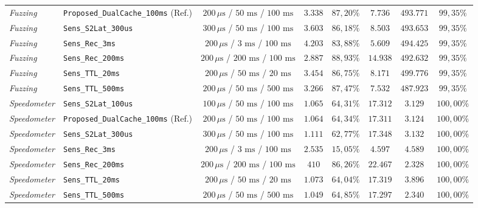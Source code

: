 \documentclass[conference]{IEEEtran}
\begin{document}
\begin{table}[t]
\begin{tabular}{@{}llcccccc@{}}
\textit{Fuzzing} & \texttt{Proposed\_DualCache\_100ms} (Ref.) & $200\,\mu\text{s}$ / $50\text{ ms}$ / $100\text{ ms}$ & $3.338$ & $87{,}20\%$ & $7.736$ & $493.771$ & $99{,}35\%$ \\
\textit{Fuzzing} & \texttt{Sens\_S2Lat\_300us} & $300\,\mu\text{s}$ / $50\text{ ms}$ / $100\text{ ms}$ & $3.603$ & $86{,}18\%$ & $8.503$ & $493.653$ & $99{,}35\%$ \\
\textit{Fuzzing} & \texttt{Sens\_Rec\_3ms} & $200\,\mu\text{s}$ / $3\text{ ms}$ / $100\text{ ms}$ & $4.203$ & $83{,}88\%$ & $5.609$ & $494.425$ & $99{,}35\%$ \\
\textit{Fuzzing} & \texttt{Sens\_Rec\_200ms} & $200\,\mu\text{s}$ / $200\text{ ms}$ / $100\text{ ms}$ & $2.887$ & $88{,}93\%$ & $14.938$ & $492.632$ & $99{,}35\%$ \\
\textit{Fuzzing} & \texttt{Sens\_TTL\_20ms} & $200\,\mu\text{s}$ / $50\text{ ms}$ / $20\text{ ms}$ & $3.454$ & $86{,}75\%$ & $8.171$ & $499.776$ & $99{,}35\%$ \\
\textit{Fuzzing} & \texttt{Sens\_TTL\_500ms} & $200\,\mu\text{s}$ / $50\text{ ms}$ / $500\text{ ms}$ & $3.266$ & $87{,}47\%$ & $7.532$ & $487.923$ & $99{,}35\%$ \\
\midrule
\textit{Speedometer} & \texttt{Sens\_S2Lat\_100us} & $100\,\mu\text{s}$ / $50\text{ ms}$ / $100\text{ ms}$ & $1.065$ & $64{,}31\%$ & $17.312$ & $3.129$ & $100{,}00\%$ \\
\textit{Speedometer} & \texttt{Proposed\_DualCache\_100ms} (Ref.) & $200\,\mu\text{s}$ / $50\text{ ms}$ / $100\text{ ms}$ & $1.064$ & $64{,}34\%$ & $17.311$ & $3.124$ & $100{,}00\%$ \\
\textit{Speedometer} & \texttt{Sens\_S2Lat\_300us} & $300\,\mu\text{s}$ / $50\text{ ms}$ / $100\text{ ms}$ & $1.111$ & $62{,}77\%$ & $17.348$ & $3.132$ & $100{,}00\%$ \\
\textit{Speedometer} & \texttt{Sens\_Rec\_3ms} & $200\,\mu\text{s}$ / $3\text{ ms}$ / $100\text{ ms}$ & $2.535$ & $15{,}05\%$ & $4.597$ & $4.589$ & $100{,}00\%$ \\
\textit{Speedometer} & \texttt{Sens\_Rec\_200ms} & $200\,\mu\text{s}$ / $200\text{ ms}$ / $100\text{ ms}$ & $410$ & $86{,}26\%$ & $22.467$ & $2.328$ & $100{,}00\%$ \\
\textit{Speedometer} & \texttt{Sens\_TTL\_20ms} & $200\,\mu\text{s}$ / $50\text{ ms}$ / $20\text{ ms}$ & $1.073$ & $64{,}04\%$ & $17.319$ & $3.896$ & $100{,}00\%$ \\
\textit{Speedometer} & \texttt{Sens\_TTL\_500ms} & $200\,\mu\text{s}$ / $50\text{ ms}$ / $500\text{ ms}$ & $1.049$ & $64{,}85\%$ & $17.297$ & $2.340$ & $100{,}00\%$ \\
\bottomrule
\end{tabular}
\end{table}
\end{document}
